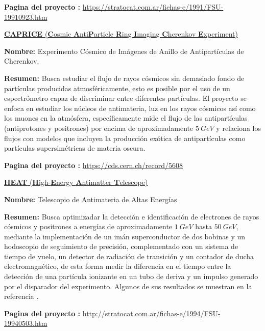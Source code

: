 \begin{itemize_f}
\begin{itemize_f}
\item \textbf{Pagina del proyecto :} \url{https://stratocat.com.ar/fichas-e/1991/FSU-19910923.htm}
\end{itemize_f}

\item[-] \href{https://core.ac.uk/display/25103181}{\textbf{CAPRICE} (\textbf{C}osmic \textbf{A}nti\textbf{P}article \textbf{R}ing \textbf{I}maging \textbf{C}herenkov \textbf{E}xperiment)}
\begin{itemize_f}
\item \textbf{Nombre:} Experimento Cósmico de Imágenes de Anillo de Antipartículas de Cherenkov.
\item \textbf{Resumen:} Busca estudiar el flujo de rayos cósmicos sin demasiado fondo de partículas producidas atmosféricamente, esto es posible por el uso de un espectrómetro capaz de discriminar entre diferentes partículas. El proyecto se enfoca en estudiar los núcleos de antimateria, luz en los rayos cósmicos así como los muones en la atmósfera, específicamente mide el flujo de las antipartículas (antiprotones y positrones) por encima de aproximadamente $5~ GeV$ y relaciona los flujos con modelos que incluyen la producción exótica de antipartículas como partículas supersimétricas de materia oscura. %
\item \textbf{Pagina del proyecto :} \url{https://cds.cern.ch/record/5608}
\end{itemize_f}

\item[-] \href{https://ui.adsabs.harvard.edu/abs/1995psu..reptR....B/abstract}{\textbf{HEAT} (\textbf{H}igh-\textbf{E}nergy \textbf{A}ntimatter \textbf{T}elescope)}
\begin{itemize_f}
\item \textbf{Nombre:} Telescopio de Antimateria de Altas Energías
\item \textbf{Resumen:} Busca optimizadar la detección e identificación de electrones de rayos cósmicos y positrones a energías de aproximadamente $1~ GeV$ hasta $50~GeV$, mediante la implementación de un imán superconductor de dos bobinas y un hodoscopio de seguimiento de precisión, complementado con un sistema de tiempo de vuelo, un detector de radiación de transición y un contador de ducha electromagnético, de esta forma medir la diferencia en el tiempo entre la detección de una partícula ionizante en un tubo de deriva y un impulso generado por el disparador del experimento. Algunos de sus resultados se muestran en la referencia \cite{hooper_kaluza-klein_2004}.
\item \textbf{Pagina del proyecto :} \url{http://stratocat.com.ar/fichas-e/1994/FSU-19940503.htm}
\end{itemize_f}


\end{itemize_f}
